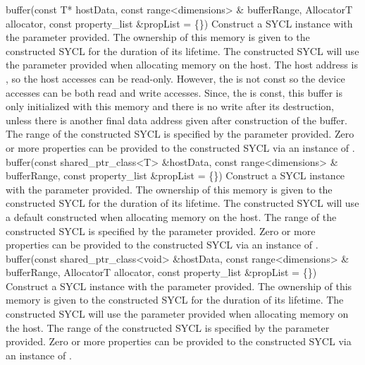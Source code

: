   \addRowFourSL
    {  buffer(const T* hostData, }
    {  const range<dimensions> \& bufferRange,}
    {  AllocatorT allocator, }
    {  const property_list \&propList = \{\}) }
    {
       Construct a SYCL  instance with the  parameter provided. The ownership of this memory is given to the constructed SYCL  for the duration of its lifetime.
       The constructed SYCL  will use the  parameter provided when allocating memory on the host.       
      The host address is , so the host accesses can be read-only. However, the  is not const so the device accesses can be both read and write accesses. Since, the  is const, this buffer is only initialized with this memory and there is no write after its destruction, unless there is another final data address given after construction of the buffer.
        The range of the constructed SYCL  is specified by the  parameter provided.
       Zero or more properties can be provided to the constructed SYCL  via an instance of .
    }
  \addRowThreeSL
   { buffer(const shared_ptr_class<T> \&hostData,}
   { const range<dimensions> \& bufferRange, }
   { const property_list \&propList = \{\}) }
   {
       Construct a SYCL  instance with the  parameter provided. The ownership of this memory is given to the constructed SYCL  for the duration of its lifetime.
       The constructed SYCL  will use a default constructed  when allocating memory on the host.
        The range of the constructed SYCL  is specified by the  parameter provided.
       Zero or more properties can be provided to the constructed SYCL  via an instance of .
    }
  \addRowFourSL
   { buffer(const shared_ptr_class<void> \&hostData,}
   { const range<dimensions> \& bufferRange, }
   { AllocatorT allocator, }
   { const property_list \&propList = \{\}) }
   {
       Construct a SYCL  instance with the  parameter provided. The ownership of this memory is given to the constructed SYCL  for the duration of its lifetime.
       The constructed SYCL  will use the  parameter provided when allocating memory on the host.
        The range of the constructed SYCL  is specified by the  parameter provided.
       Zero or more properties can be provided to the constructed SYCL  via an instance of .
   }
